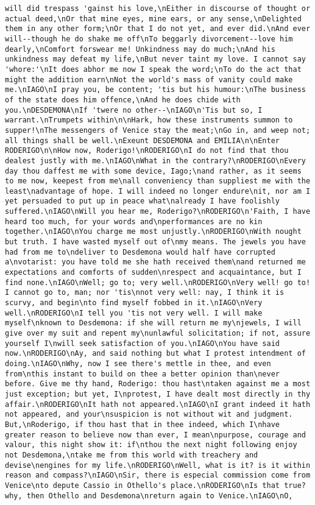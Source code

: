 \begin{verbatim}
will did trespass 'gainst his love,\nEither in discourse of thought or actual deed,\nOr that mine eyes, mine ears, or any sense,\nDelighted them in any other form;\nOr that I do not yet, and ever did.\nAnd ever will--though he do shake me off\nTo beggarly divorcement--love him dearly,\nComfort forswear me! Unkindness may do much;\nAnd his unkindness may defeat my life,\nBut never taint my love. I cannot say 'whore:'\nIt does abhor me now I speak the word;\nTo do the act that might the addition earn\nNot the world's mass of vanity could make me.\nIAGO\nI pray you, be content; 'tis but his humour:\nThe business of the state does him offence,\nAnd he does chide with you.\nDESDEMONA\nIf 'twere no other--\nIAGO\n'Tis but so, I warrant.\nTrumpets within\n\nHark, how these instruments summon to supper!\nThe messengers of Venice stay the meat;\nGo in, and weep not; all things shall be well.\nExeunt DESDEMONA and EMILIA\n\nEnter RODERIGO\n\nHow now, Roderigo!\nRODERIGO\nI do not find that thou dealest justly with me.\nIAGO\nWhat in the contrary?\nRODERIGO\nEvery day thou daffest me with some device, Iago;\nand rather, as it seems to me now, keepest from me\nall conveniency than suppliest me with the least\nadvantage of hope. I will indeed no longer endure\nit, nor am I yet persuaded to put up in peace what\nalready I have foolishly suffered.\nIAGO\nWill you hear me, Roderigo?\nRODERIGO\n'Faith, I have heard too much, for your words and\nperformances are no kin together.\nIAGO\nYou charge me most unjustly.\nRODERIGO\nWith nought but truth. I have wasted myself out of\nmy means. The jewels you have had from me to\ndeliver to Desdemona would half have corrupted a\nvotarist: you have told me she hath received them\nand returned me expectations and comforts of sudden\nrespect and acquaintance, but I find none.\nIAGO\nWell; go to; very well.\nRODERIGO\nVery well! go to! I cannot go to, man; nor 'tis\nnot very well: nay, I think it is scurvy, and begin\nto find myself fobbed in it.\nIAGO\nVery well.\nRODERIGO\nI tell you 'tis not very well. I will make myself\nknown to Desdemona: if she will return me my\njewels, I will give over my suit and repent my\nunlawful solicitation; if not, assure yourself I\nwill seek satisfaction of you.\nIAGO\nYou have said now.\nRODERIGO\nAy, and said nothing but what I protest intendment of doing.\nIAGO\nWhy, now I see there's mettle in thee, and even from\nthis instant to build on thee a better opinion than\never before. Give me thy hand, Roderigo: thou hast\ntaken against me a most just exception; but yet, I\nprotest, I have dealt most directly in thy affair.\nRODERIGO\nIt hath not appeared.\nIAGO\nI grant indeed it hath not appeared, and your\nsuspicion is not without wit and judgment. But,\nRoderigo, if thou hast that in thee indeed, which I\nhave greater reason to believe now than ever, I mean\npurpose, courage and valour, this night show it: if\nthou the next night following enjoy not Desdemona,\ntake me from this world with treachery and devise\nengines for my life.\nRODERIGO\nWell, what is it? is it within reason and compass?\nIAGO\nSir, there is especial commission come from Venice\nto depute Cassio in Othello's place.\nRODERIGO\nIs that true? why, then Othello and Desdemona\nreturn again to Venice.\nIAGO\nO, 
\end{verbatim}
